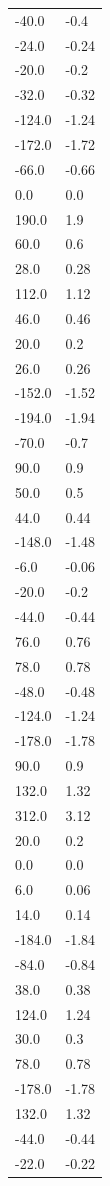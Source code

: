 \begin{longtable}{ll}
-40.0 & -0.4 \\
-24.0 & -0.24 \\
-20.0 & -0.2 \\
-32.0 & -0.32 \\
-124.0 & -1.24 \\
-172.0 & -1.72 \\
-66.0 & -0.66 \\
0.0 & 0.0 \\
190.0 & 1.9 \\
60.0 & 0.6 \\
28.0 & 0.28 \\
112.0 & 1.12 \\
46.0 & 0.46 \\
20.0 & 0.2 \\
26.0 & 0.26 \\
-152.0 & -1.52 \\
-194.0 & -1.94 \\
-70.0 & -0.7 \\
90.0 & 0.9 \\
50.0 & 0.5 \\
44.0 & 0.44 \\
-148.0 & -1.48 \\
-6.0 & -0.06 \\
-20.0 & -0.2 \\
-44.0 & -0.44 \\
76.0 & 0.76 \\
78.0 & 0.78 \\
-48.0 & -0.48 \\
-124.0 & -1.24 \\
-178.0 & -1.78 \\
90.0 & 0.9 \\
132.0 & 1.32 \\
312.0 & 3.12 \\
20.0 & 0.2 \\
0.0 & 0.0 \\
6.0 & 0.06 \\
14.0 & 0.14 \\
-184.0 & -1.84 \\
-84.0 & -0.84 \\
38.0 & 0.38 \\
124.0 & 1.24 \\
30.0 & 0.3 \\
78.0 & 0.78 \\
-178.0 & -1.78 \\
132.0 & 1.32 \\
-44.0 & -0.44 \\
-22.0 & -0.22 \\

\end{longtable}
